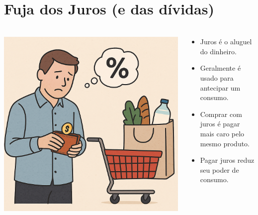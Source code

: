 \section{Fuja dos Juros (e das dívidas)} \label{FormProb}

\begin{frame}[c]
    \frametitle{}
    \begin{columns}
        \begin{column}{0.5\textwidth}
            \includegraphics[width=\textwidth]{figuras/consumo2.png}
        \end{column}
        \begin{column}{0.5\textwidth}
            \centering
            \begin{itemize}
                \item Juros é o aluguel do dinheiro.
                \item Geralmente é usado para antecipar um consumo.
                \item Comprar com juros é pagar mais caro pelo mesmo produto.
                \item Pagar juros reduz seu poder de consumo.
            \end{itemize}
        \end{column}
    \end{columns}
\end{frame}

